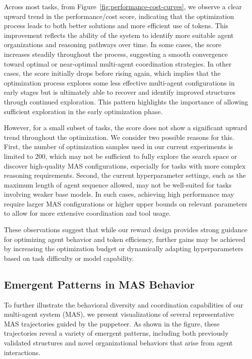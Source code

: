 \documentclass{article}
\begin{document}
Across most tasks, from Figure~\ref{fig:performance-cost-curves}, we observe a clear upward trend in the performance/cost score, indicating that the optimization process leads to both better solutions and more efficient use of tokens. This improvement reflects the ability of the system to identify more suitable agent organizations and reasoning pathways over time. In some cases, the score increases steadily throughout the process, suggesting a smooth convergence toward optimal or near-optimal multi-agent coordination strategies. In other cases, the score initially drops before rising again, which implies that the optimization process explores some less effective multi-agent configurations in early stages but is ultimately able to recover and identify improved structures through continued exploration. This pattern highlights the importance of allowing sufficient exploration in the early optimization phase.

However, for a small subset of tasks, the score does not show a significant upward trend throughout the optimization. We consider two possible reasons for this. First, the number of optimization samples used in our current experiments is limited to 200, which may not be sufficient to fully explore the search space or discover high-quality MAS configurations, especially for tasks with more complex reasoning requirements. Second, the current hyperparameter settings, such as the maximum length of agent sequence allowed, may not be well-suited for tasks involving weaker base models. In such cases, achieving high performance may require larger MAS configurations or higher upper bounds on relevant parameters to allow for more extensive coordination and tool usage.

These observations suggest that while our reward design provides strong guidance for optimizing agent behavior and token efficiency, further gains may be achieved by increasing the optimization budget or dynamically adapting hyperparameters based on task difficulty or model capability.

\subsection{Emergent Patterns in MAS Behavior}
To further illustrate the behavioral diversity and coordination capabilities of our multi-agent system (MAS), we present visualizations of several representative MAS trajectories guided by the puppeteer. As shown in the figure, these trajectories reveal a variety of emergent patterns, including both previously validated structures and novel organizational behaviors that arise from agent interactions.
\end{document}
